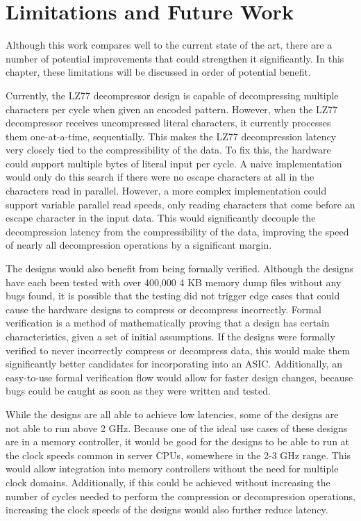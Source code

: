 \documentclass[doublespace,nopageskip]{VTthesis}
\begin{document}
\chapter{Limitations and Future Work} \label{ch:discussion}
Although this work compares well to the current state of the art, there are a number of potential improvements that could strengthen it significantly. In this chapter, these limitations will be discussed in order of potential benefit.

Currently, the LZ77 decompressor design is capable of decompressing multiple characters per cycle when given an encoded pattern. However, when the LZ77 decompressor receives uncompressed literal characters, it currently processes them one-at-a-time, sequentially. This makes the LZ77 decompression latency very closely tied to the compressibility of the data. To fix this, the hardware could support multiple bytes of literal input per cycle. A naive implementation would only do this search if there were no escape characters at all in the characters read in parallel. However, a more complex implementation could support variable parallel read speeds, only reading characters that come before an escape character in the input data. This would significantly decouple the decompression latency from the compressibility of the data, improving the speed of nearly all decompression operations by a significant margin.

The designs would also benefit from being formally verified. Although the designs have each been tested with over 400,000 4 KB memory dump files without any bugs found, it is possible that the testing did not trigger edge cases that could cause the hardware designs to compress or decompress incorrectly. Formal verification is a method of mathematically proving that a design has certain characteristics, given a set of initial assumptions. If the designs were formally verified to never incorrectly compress or decompress data, this would make them significantly better candidates for incorporating into an ASIC. Additionally, an easy-to-use formal verification flow would allow for faster design changes, because bugs could be caught as soon as they were written and tested.

While the designs are all able to achieve low latencies, some of the designs are not able to run above 2 GHz. Because one of the ideal use cases of these designs are in a memory controller, it would be good for the designs to be able to run at the clock speeds common in server CPUs, somewhere in the 2-3 GHz range. This would allow integration into memory controllers without the need for multiple clock domains. Additionally, if this could be achieved without increasing the number of cycles needed to perform the compression or decompression operations, increasing the clock speeds of the designs would also further reduce latency.
\end{document}
